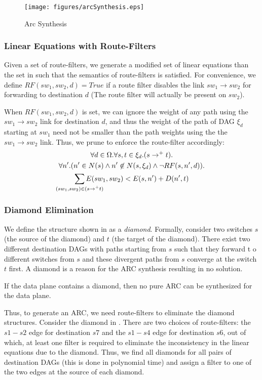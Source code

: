 \begin{figure}
	\centering
	\texttt{[image: figures/arcSynthesis.eps]}
	\caption{Arc Synthesis} \label{fig:diamond}
\end{figure}

\subsubsection{Linear Equations with Route-Filters}
Given a set of route-filters, we generate a modified 
set of linear equations than the set in 
such that the semantics of route-filters is satisfied. 
For convenience, we define $RF(sw_1, sw_2, d) = True$ 
if a route filter disables the link $sw_1 \rightarrow sw_2$
for forwarding to destination $d$ (The route filter will
actually be present on $sw_2$). 

When $RF(sw_1, sw_2, d)$ is set, we can ignore the 
weight of any path using the $sw_1 \rightarrow sw_2$
link for destination $d$, and thus 
the weight of the path of DAG $\xi_d$
starting at $sw_1$ need not be smaller than the path weights
using the the $sw_1 \rightarrow sw_2$ link. Thus,
we prune  to enforce the route-filter accordingly:
\begin{multline} \label{eq:uniq}
		\forall d \in \Omega. \forall s, t \in \xi_d. (s \rightarrow^+ t).\\ 
		\forall n'. (n' \in N(s) \wedge n' \not\in N(s, \xi_d) \wedge \neg RF(s,n',d)). \\
		\sum_{\mathclap{\substack{(sw_1, sw_2) \in (s \rightarrow^+ t)}}} 
		E(sw_1, sw_2) < E(s, n') + D(n', t)   
\end{multline}

\subsubsection{Diamond Elimination}
We define the structure shown in 
as a \emph{diamond}. Formally,
consider two switches $s$ (the source of the diamond) 
and $t$ (the target of the diamond).
There exist two different destination DAGs with 
paths starting from $s$ such that they forward t
o different switches from $s$  
and these divergent paths from $s$ converge
at the switch $t$ first. A diamond is 
a reason for the ARC synthesis resulting in no
solution. 
\begin{theorem} \label{thm:diamond}
If the data plane contains a diamond, then no pure ARC  
can be synthesized for the data plane.
\end{theorem}
Thus, to generate an ARC, we need route-filters
to eliminate the diamond structures. Consider
the diamond in . There are two choices
of route-filters: the $s1-s2$ edge for destination $s7$ 
and the $s1-s4$ edge for destination $s6$, out of which,
at least one filter is required to eliminate the 
inconsistency in the linear equations due to the diamond.
Thus, we find all diamonds for all pairs of destination
DAGs (this is done in polynomial time) and assign a filter
to one of the two edges at the source of each diamond. 

